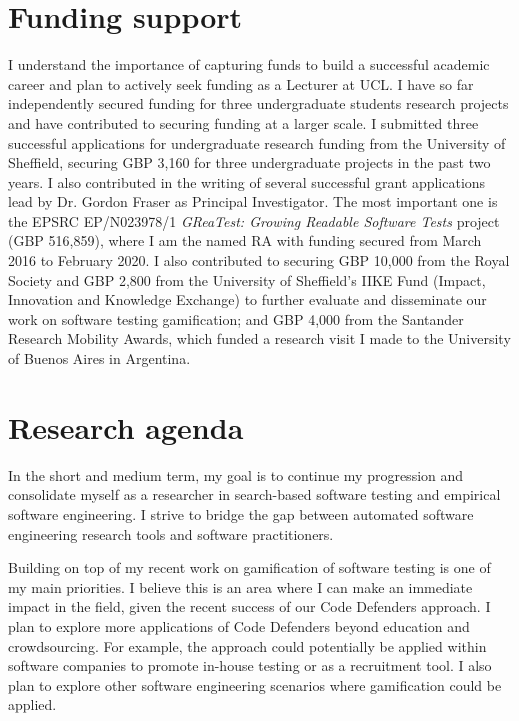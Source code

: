 \documentclass[a4paper]{article}
\begin{document}
\section{Funding support}

I understand the importance of capturing funds to build a successful
academic career and plan to actively seek funding as a Lecturer at
UCL. I have so far independently secured funding for three
undergraduate students research projects and have contributed to
securing funding at a larger scale. I submitted three successful
applications for undergraduate research funding from the University of
Sheffield, securing GBP 3,160 for three undergraduate projects in the
past two years. I also contributed in the writing of several
successful grant applications lead by Dr. Gordon Fraser as Principal
Investigator. The most important one is the EPSRC EP/N023978/1
\emph{GReaTest: Growing Readable Software Tests} project (GBP
516,859), where I am the named RA with funding secured from March 2016
to February 2020. I also contributed to securing GBP 10,000 from the
Royal Society and GBP 2,800 from the University of Sheffield's IIKE
Fund (Impact, Innovation and Knowledge Exchange) to further evaluate
and disseminate our work on software testing gamification; and GBP
4,000 from the Santander Research Mobility Awards, which funded a
research visit I made to the University of Buenos Aires in Argentina.

\section{Research agenda}

In the short and medium term, my goal is to continue my progression
and consolidate myself as a researcher in search-based software
testing and empirical software engineering. I strive to bridge the gap
between automated software engineering research tools and software
practitioners.

Building on top of my recent work on gamification of software testing
is one of my main priorities. I believe this is an area where I can
make an immediate impact in the field, given the recent success of our
Code Defenders approach. I plan to explore more applications of Code
Defenders beyond education and crowdsourcing. For example, the
approach could potentially be applied within software companies to
promote in-house testing or as a recruitment tool. I also plan to
explore other software engineering scenarios where gamification could
be applied.
\end{document}
